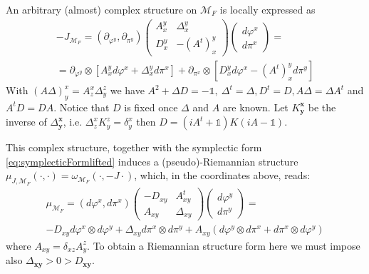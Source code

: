 \documentclass[12pt]{article}%
\begin{document}
An arbitrary (almost) complex structure on $\mathcal{M}_F$ is locally expressed as 
\begin{multline}
\label{eq:complexStructure}
-J_{\mathcal{M}_F} =
(\partial_{\varphi^y},\partial_{\pi^y})\left( \begin{array}{cc}
A^y_x & \Delta^y_x \\
D^y_x & -(A^t)^y_x
\end{array} \right)  \left( \begin{array}{c}
d\varphi^{x} \\
d\pi^{x}
\end{array} \right)=\\
=  \partial_{\varphi^y} \otimes[A^y_xd\varphi^x+\Delta^y_xd\pi^x]+ \partial_{\pi^x}\otimes [D^y_xd\varphi^x-(A^t)^y_xd\pi^y]
\end{multline}
With $(A\Delta)^x_y=A^x_z\Delta^z_y$ we have $A^2+\Delta D=-\mathds{1},\ \Delta^t=\Delta, D^t=D, A\Delta=\Delta A^t$ and $A^tD=DA$. Notice that $D$ is fixed once $\Delta$  and $A$ are known. Let $K^{\mathbf{x}}_{\mathbf{y}}$ be the inverse of $\Delta_\mathbf{y}^{\mathbf{x}}$, i.e. $\Delta^{x}_zK^z_{y}=\delta^x_y$ then $D=(iA^t+\mathds{1})K(iA-\mathds{1})$.

 

This complex structure, together with the symplectic form \eqref{eq:symplecticFormlifted} induces a (pseudo)-Riemannian structure $\mu_{J,\mathcal{M}_F}(\cdot,\cdot)=\omega_{\mathcal{M}_F}(\cdot,-J\cdot)$, which, in the coordinates above, reads: 
\begin{multline}
\label{eq:riemannianInduced}
\mu_{\mathcal{M}_F}=(d\varphi^{x},d\pi^{x}) \left( \begin{array}{cc}
    -D_{xy} & A^t_{xy} \\
    A_{xy} & \Delta_{xy}
    \end{array} \right) \left( \begin{array}{c}
        d\varphi^{y} \\
        d\pi^{y}
    \end{array} \right)=\\
    -D_{xy}d\varphi^x\otimes d\varphi^y+\Delta_{xy}d\pi^x\otimes d\pi^y+ A_{xy}(d\varphi^y\otimes d\pi^x+d\pi^x\otimes d\varphi^y)
\end{multline}
where $A_{xy}=\delta_{xz}A^z_y$. To obtain a Riemannian structure form here we must impose also $\Delta_{\mathbf{xy}}>0>D_{\mathbf{xy}}$. 
\end{document}
